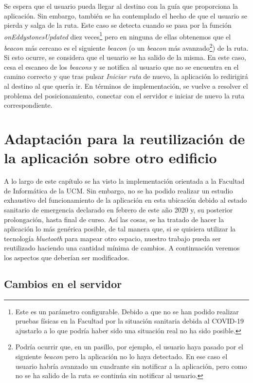 \begin{itemize}
	Se espera que el usuario pueda llegar al destino con la guía que proporciona la aplicación. Sin embargo, también se ha contemplado el hecho de que el usuario se pierda y salga de la ruta. Este caso se detecta cuando se pasa por la función \textit{onEddystonesUpdated} diez veces\footnote{Este es un parámetro configurable. Debido a que no se han podido realizar pruebas físicas en la Facultad por la situación sanitaria debida al COVID-19 ajustarlo a lo que podría haber sido una situación real no ha sido posible.} pero en ninguna de ellas obtenemos que el \textit{beacon} más cercano es el siguiente \textit{beacon} (o un \textit{beacon} más avanzado\footnote{Podría ocurrir que, en un pasillo, por ejemplo, el usuario haya pasado por el siguiente \textit{beacon} pero la aplicación no lo haya detectado. En ese caso el usuario habría avanzado un cuadrante sin notificar a la aplicación, pero como no se ha salido de la ruta se continúa sin notificar al usuario.}) de la ruta. Si esto ocurre, se considera que el usuario se ha salido de la misma. En este caso, cesa el escaneo de los \textit{beacons} y se notifica al usuario que no se encuentra en el camino correcto y que tras pulsar \textit{Iniciar ruta} de nuevo, la aplicación lo redirigirá al destino al que quería ir. En términos de implementación, se vuelve a resolver el problema del posicionamiento, conectar con el servidor e iniciar de nuevo la ruta correspondiente.
	
\end{itemize}


\section{Adaptación para la reutilización de la aplicación sobre otro edificio}

A lo largo de este capítulo se ha visto la implementación orientada a la Facultad de Informática de la UCM. Sin embargo, no se ha podido realizar un estudio exhaustivo del funcionamiento de la aplicación en esta ubicación debido al estado sanitario de emergencia declarado en febrero de este año 2020 y, su posterior prolongación, hasta final de curso. Así las cosas, se ha tratado de hacer la aplicación lo más genérica posible, de tal manera que, si se quisiera utilizar la tecnología \textit{bluetooth} para mapear otro espacio, nuestro trabajo pueda ser reutilizado haciendo una cantidad mínima de cambios. A continuación veremos los aspectos que deberían ser modificados.

\subsection{Cambios en el servidor}

